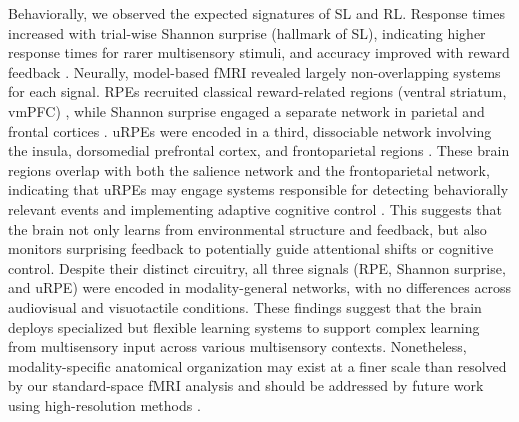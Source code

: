 \documentclass{article}
\begin{document}
Behaviorally, we observed the expected signatures of SL and RL. Response times increased with trial-wise Shannon surprise (hallmark of SL), indicating higher response times for rarer multisensory stimuli, and accuracy improved with reward feedback \cite{konovalov2018neurocomputational, daw2011trial}. Neurally, model-based fMRI revealed largely non-overlapping systems for each signal. RPEs recruited classical reward-related regions (ventral striatum, vmPFC) \cite{Schultz1997, o2003temporal, bartra2013valuation, corlett2022meta, garrison2013prediction, fouragnan2018separate}, while Shannon surprise engaged a separate network in parietal and frontal cortices \cite{o2013dissociable, visalli2019bayesian}. uRPEs were encoded in a third, dissociable network involving the insula, dorsomedial prefrontal cortex, and frontoparietal regions \cite{fouragnan2018separate, corlett2022meta}. These brain regions overlap with both the salience network and the frontoparietal network, indicating that uRPEs may engage systems responsible for detecting behaviorally relevant events and implementing adaptive cognitive control \cite{seeley2019salience, marek2018frontoparietal}. This suggests that the brain not only learns from environmental structure and feedback, but also monitors surprising feedback to potentially guide attentional shifts or cognitive control. Despite their distinct circuitry, all three signals (RPE, Shannon surprise, and uRPE) were encoded in modality-general networks, with no differences across audiovisual and visuotactile conditions. These findings suggest that the brain deploys specialized but flexible learning systems to support complex learning from multisensory input across various multisensory contexts. Nonetheless, modality-specific anatomical organization may exist at a finer scale than resolved by our standard-space fMRI analysis and should be addressed by future work using high-resolution methods \cite{poldrack2017precision,ladwig2025precision}.\newline
\end{document}
